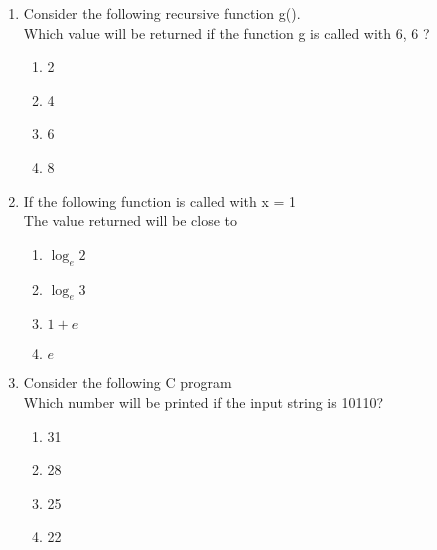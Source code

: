 \documentclass[journal,12pt,onecolumn]{IEEEtran}
\theoremstyle{remark}
\begin{document}
\begin{enumerate}
\begin{multicols}{4}
    \end{multicols}{4}
    
    



\item Consider the following recursive function g().\\




Which value will be returned if the function g  is called with 6, 6 ?
\begin{multicols}{4}
\begin{enumerate}
\item 2
\item 4
\item 6
\item 8
\end{enumerate}
 \end{multicols}

\item If the following function is called with  x = 1 \\





The value returned will be close to
\begin{multicols}{4}
\begin{enumerate}
\item $\log_e 2$ 
\item $\log_e 3 $
\item $1 + e$ 
\item $e $
\end{enumerate}
\end{multicols}
    
\item Consider the following C program \\ 



Which number will be printed if the input string is 10110?
\begin{multicols}{4}
\begin{enumerate}
\item 31
\item 28
\item 25
\item 22
\end{enumerate}    
\end{multicols}
    
\end{enumerate}
\end{document}
